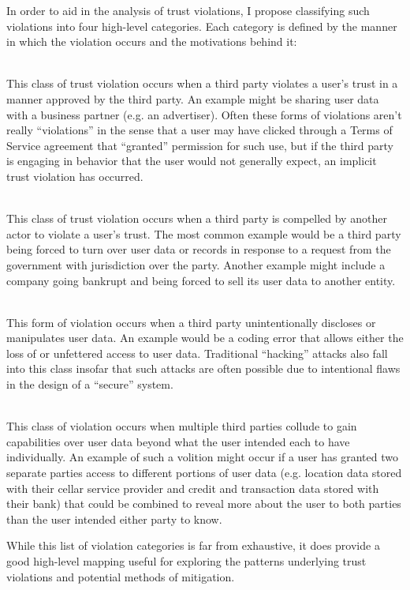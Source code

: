 In order to aid in the analysis of trust violations, I propose
classifying such violations into four high-level categories. Each
category is defined by the manner in which the violation occurs and
the motivations behind it:

\begin{packed_desc}
\item[Implicit (P-Violation):] \hfill \\ This class of trust violation
  occurs when a third party violates a user's trust in a manner
  approved by the third party. An example might be sharing user data
  with a business partner (e.g. an advertiser). Often these forms of
  violations aren't really ``violations'' in the sense that a user may
  have clicked through a Terms of Service agreement that ``granted''
  permission for such use, but if the third party is engaging in
  behavior that the user would not generally expect, an implicit trust
  violation has occurred.
\item[Compelled (C-Violation):] \hfill \\ This class of trust
  violation occurs when a third party is compelled by another actor to
  violate a user's trust. The most common example would be a third
  party being forced to turn over user data or records in response to
  a request from the government with jurisdiction over the
  party. Another example might include a company going bankrupt and
  being forced to sell its user data to another entity.
\item[Unintentional (U-Violation):] \hfill \\ This form of violation
  occurs when a third party unintentionally discloses or manipulates
  user data. An example would be a coding error that allows either the
  loss of or unfettered access to user data. Traditional ``hacking''
  attacks also fall into this class insofar that such attacks are
  often possible due to intentional flaws in the design of a
  ``secure'' system.
\item[Colluding (L-Violation):] \hfill \\ This class of violation
  occurs when multiple third parties collude to gain capabilities over
  user data beyond what the user intended each to have
  individually. An example of such a volition might occur if a user
  has granted two separate parties access to different portions of
  user data (e.g. location data stored with their cellar service
  provider and credit and transaction data stored with their bank)
  that could be combined to reveal more about the user to both parties
  than the user intended either party to know.
\end{packed_desc}

While this list of violation categories is far from exhaustive, it
does provide a good high-level mapping useful for exploring the
patterns underlying trust violations and potential methods of
mitigation.
